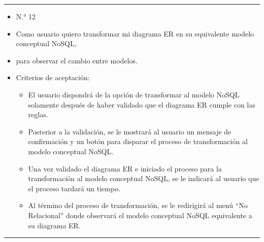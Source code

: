 \noindent\rule{\textwidth}{1pt}
\begin{itemize}
	\item N.° 12
	\item Como usuario quiero transformar mi diagrama ER en su equivalente modelo conceptual NoSQL,
	\item para observar el cambio entre modelos.
	\item Criterios de aceptación:
	\begin{itemize}
		\item El usuario dispondrá de la opción de transformar al modelo NoSQL solamente después de haber validado que el diagrama ER cumple con las reglas.
		\item Posterior a la validación, se le mostrará al usuario un mensaje de confirmación y un botón para disparar el proceso de transformación al modelo conceptual NoSQL.
		\item Una vez validado el diagrama ER e iniciado el proceso para la transformación al modelo conceptual NoSQL, se le indicará al usuario que el proceso tardará un tiempo.
		\item Al término del proceso de transformación, se le redirigirá al menú ``No Relacional'' donde observará el modelo conceptual NoSQL equivalente a su diagrama ER.
	\end{itemize}
\end{itemize}
\noindent\rule{\textwidth}{1pt}
